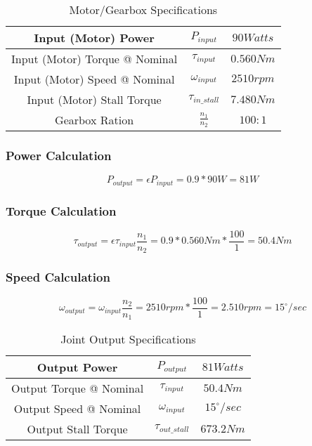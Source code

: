 
\begin{table}[H]
    \centering
    \begin{tabular}{||c|c|c||}
        \hline
        Input (Motor) Power & \(P_{input}\) & \(90 Watts\) \\
        \hline
        Input (Motor) Torque @ Nominal & \(\tau_{input}\) & \(0.560 Nm\) \\
        \hline
        Input (Motor) Speed @ Nominal & \(\omega_{input}\) & \(2510 rpm\) \\
        \hline
        Input (Motor) Stall Torque & \(\tau_{in\_stall}\) & \(7.480 Nm\) \\
        \hline
        Gearbox Ration & \(\frac{n_1}{n_2}\) & \(100:1\) \\
        \hline
    \end{tabular}
    \caption{Motor/Gearbox Specifications}
    \label{table:ApxMotorGearboxSpecs}
\end{table}

\subsubsection{Power Calculation}
\begin{equation}
    P_{output} = \epsilon P_{input} = 0.9 * 90W = 81W
     \label{eq:PowerCalc}
\end{equation}

\subsubsection{Torque Calculation}
\begin{equation}
    \tau_{output} = \epsilon  \tau_{input} \frac{n_1}{n_2} = 0.9 * 0.560 Nm * \frac{100}{1} = 50.4 Nm
    \label{eq:TorqueCalc}
\end{equation}

\subsubsection{Speed Calculation}
\begin{equation}
    \omega_{output} = \omega_{input}  \frac{n_2}{n_1} = 2510 rpm * \frac{100}{1} = 2.510 rpm = 15^\circ/sec
    \label{eq:SpeedCalc}
\end{equation}

\begin{table}[H]
    \centering
    \begin{tabular}{||c|c|c||}
        \hline
        Output Power & \(P_{output}\) & \(81 Watts\) \\
        \hline
        Output Torque @ Nominal & \(\tau_{input}\) & \(50.4 Nm\) \\
        \hline
        Output Speed @ Nominal & \(\omega_{input}\) & \(15^\circ/sec\) \\
        \hline
        Output Stall Torque & \(\tau_{out\_stall}\) & \(673.2 Nm\) \\
        \hline
    \end{tabular}
    \caption{Joint Output Specifications}
    \label{table:ApxJointSpecs}
\end{table}